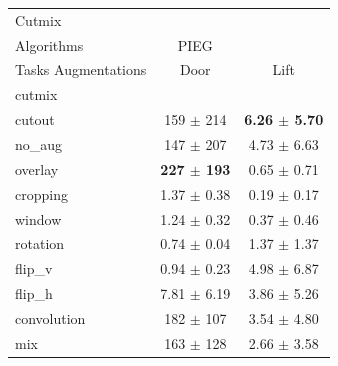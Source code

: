 \begin{tabular}{lcc}
Cutmix & & \\
Algorithms & PIEG & \\
Tasks Augmentations & Door & Lift \\
cutmix          &  &  \\
cutout          & 159 $\pm$ 214 & \textbf{6.26 $\pm$ 5.70} \\
no\_aug         & 147 $\pm$ 207 & 4.73 $\pm$ 6.63 \\
overlay         & \textbf{227 $\pm$ 193} & 0.65 $\pm$ 0.71 \\
cropping        & 1.37 $\pm$ 0.38 & 0.19 $\pm$ 0.17 \\
window          & 1.24 $\pm$ 0.32 & 0.37 $\pm$ 0.46 \\
rotation        & 0.74 $\pm$ 0.04 & 1.37 $\pm$ 1.37 \\
flip\_v         & 0.94 $\pm$ 0.23 & 4.98 $\pm$ 6.87 \\
flip\_h         & 7.81 $\pm$ 6.19 & 3.86 $\pm$ 5.26 \\
convolution     & 182 $\pm$ 107 & 3.54 $\pm$ 4.80 \\
mix             & 163 $\pm$ 128 & 2.66 $\pm$ 3.58 \\
\end{tabular}